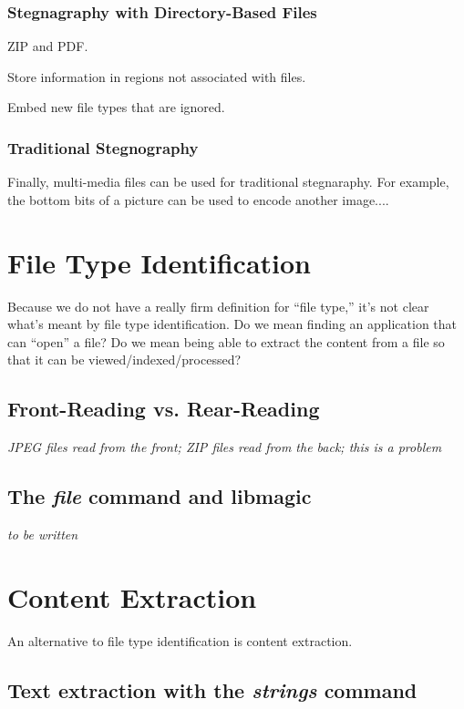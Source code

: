 \documentclass[11pt,letter]{article}
\begin{document}
\subsubsection{Stegnagraphy with Directory-Based Files}

ZIP and PDF.

Store information in regions not associated with files.

Embed new file types that are ignored.

\subsubsection{Traditional Stegnography}
Finally, multi-media files can be used for traditional
stegnaraphy. For example, the bottom bits of a picture can be used to
encode another image....



\section{File Type Identification}

Because we do not have a really firm definition for ``file type,''
it's not clear what's meant by file type identification. Do we mean
finding an application that can ``open'' a file? Do we mean being able
to extract the content from a file so that it can be viewed/indexed/processed?

\subsection{Front-Reading vs. Rear-Reading}

\emph{JPEG files read from the front; ZIP files read from the back;
  this is a problem}


\subsection{The \emph{file} command and libmagic}

\emph{to be written}

\section{Content Extraction}

An alternative to file type identification is content extraction.

\subsection{Text extraction with the \emph{strings} command}
\end{document}
